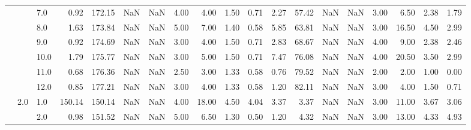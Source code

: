 \begin{tabular}{lllrrrrrrrrrrrrrrrr}
       &     & 7.0  &      0.92 &     172.15 &               NaN &                NaN &  4.00 &   4.00 &             1.50 &                         0.71 &      2.27 &      57.42 &               NaN &                NaN &  3.00 &   6.50 &             2.38 &                         1.79 \\
       &     & 8.0  &      1.63 &     173.84 &               NaN &                NaN &  5.00 &   7.00 &             1.40 &                         0.58 &      5.85 &      63.81 &               NaN &                NaN &  3.00 &  16.50 &             4.50 &                         2.99 \\
       &     & 9.0  &      0.92 &     174.69 &               NaN &                NaN &  3.00 &   4.00 &             1.50 &                         0.71 &      2.83 &      68.67 &               NaN &                NaN &  4.00 &   9.00 &             2.38 &                         2.46 \\
       &     & 10.0 &      1.79 &     175.77 &               NaN &                NaN &  3.00 &   5.00 &             1.50 &                         0.71 &      7.47 &      76.08 &               NaN &                NaN &  4.00 &  20.50 &             3.50 &                         2.99 \\
       &     & 11.0 &      0.68 &     176.36 &               NaN &                NaN &  2.50 &   3.00 &             1.33 &                         0.58 &      0.76 &      79.52 &               NaN &                NaN &  2.00 &   2.00 &             1.00 &                         0.00 \\
       &     & 12.0 &      0.85 &     177.21 &               NaN &                NaN &  3.00 &   4.00 &             1.33 &                         0.58 &      1.20 &      82.11 &               NaN &                NaN &  3.00 &   4.00 &             1.50 &                         0.71 \\
       & 2.0 & 1.0  &    150.14 &     150.14 &               NaN &                NaN &  4.00 &  18.00 &             4.50 &                         4.04 &      3.37 &       3.37 &               NaN &                NaN &  3.00 &  11.00 &             3.67 &                         3.06 \\
       &     & 2.0  &      0.98 &     151.52 &               NaN &                NaN &  5.00 &   6.50 &             1.30 &                         0.50 &      1.20 &       4.32 &               NaN &                NaN &  3.00 &  13.00 &             4.33 &                         4.93 \\

\end{tabular}
